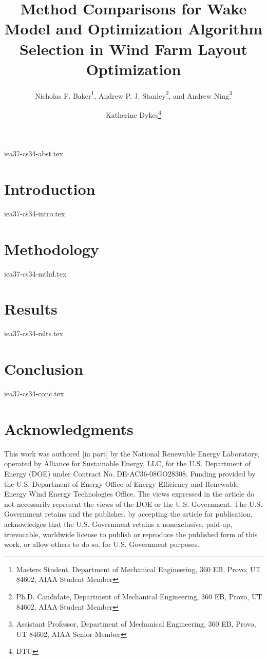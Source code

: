 \documentclass[conf,hidelinks]{new-aiaa} %
\title{Method Comparisons for Wake Model and Optimization Algorithm Selection in Wind Farm Layout Optimization}
\author{Nicholas F. Baker\footnote{Masters Student, Department of Mechanical Engineering, 360 EB, Provo, UT 84602, AIAA Student Member},
		 Andrew P. J. Stanley\footnote{Ph.D. Candidate, Department of Mechanical Engineering, 360 EB, Provo, UT 84602, AIAA Student Member},
		 and Andrew Ning\footnote{Assistant Professor, Department of Mechanical Engineering, 360 EB, Provo, UT 84602, AIAA Senior Member}}
\affil{Brigham Young University, Provo, Utah 84602.}
\author{Katherine Dykes\footnote{DTU}}
\affil{Danmarks Tekniske Universitet, 2800 Kgs. Lyngby, Denmark.}
\begin{document}
\maketitle{}

{iea37-cs34-abst.tex}

\section{Introduction}

	{iea37-cs34-intro.tex}

\section{Methodology} \label{sec:meth}

	{iea37-cs34-mthd.tex}

\section{Results} \label{sec:res}

	{iea37-cs34-rslts.tex}

\section{Conclusion} \label{sec:conc}

	{iea37-cs34-conc.tex}

\pagebreak
\appendix

\section*{Acknowledgments}
This work was authored [in part] by the National Renewable Energy Laboratory, operated by Alliance for Sustainable Energy, LLC, for the U.S. Department of Energy (DOE) under Contract No. DE-AC36-08GO28308.
Funding provided by the U.S. Department of Energy Office of Energy Efficiency and Renewable Energy Wind Energy Technologies Office.
The views expressed in the article do not necessarily represent the views of the DOE or the U.S. Government.
The U.S. Government retains and the publisher, by accepting the article for publication, acknowledges that the U.S. Government retains a nonexclusive, paid-up, irrevocable, worldwide license to publish or reproduce the published form of this work, or allow others to do so, for U.S. Government purposes.
\end{document}
